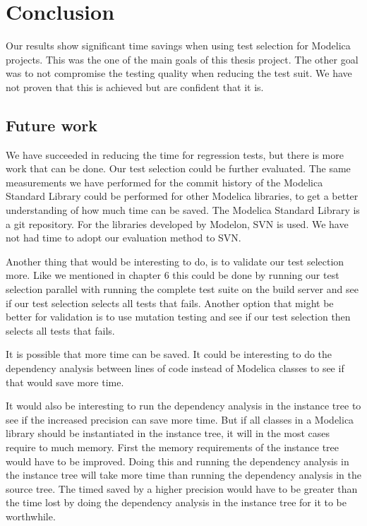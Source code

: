\documentclass{cslthse-msc}
\begin{document}
\chapter[Conclusion]{Conclusion}
Our results show significant time savings when using test selection for Modelica projects. This was the one of the main goals of this thesis project. The other goal was to not compromise the testing quality when reducing the test suit. We have not proven that this is achieved but are confident that it is. 

\section{Future work}
We have succeeded in reducing the time for regression tests, but there is more work that can be done. Our test selection could be further evaluated. The same measurements we have performed for the commit history of the Modelica Standard Library could be performed for other Modelica libraries, to get a better understanding of how much time can be saved. The Modelica Standard Library is a git repository. For the libraries developed by Modelon, SVN is used. We have not had time to adopt our evaluation method to SVN.

Another thing that would be interesting to do, is to validate our test selection more. Like we mentioned in chapter 6 this could be done by running our test selection parallel with running the complete test suite on the build server and see if our test selection selects all tests that fails. Another option that might be better for validation is to use mutation testing and see if our test selection then selects all tests that fails.

It is possible that more time can be saved. It could be interesting to do the dependency analysis between lines of code instead of Modelica classes to see if that would save more time.

It would also be interesting to run the dependency analysis in the instance tree to see if the increased precision can save more time. But if all classes in a Modelica library should be instantiated in the instance tree, it will in the most cases require to much memory. First the memory requirements of the instance tree would have to be improved. Doing this and running the dependency analysis in the instance tree will take more time than running the dependency analysis in the source tree. The timed saved by a higher precision would have to be greater than the time lost by doing the dependency analysis in the instance tree for it to be worthwhile.

\printbibliography[heading=bibintoc]

\end{document}
